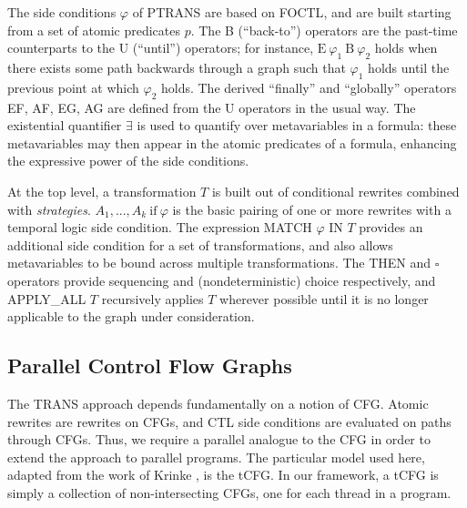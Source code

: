 \documentclass{eptcs}
\newcommand{\ptrans}[0]{PTRANS}
\newcommand{\EB}[2]{\textrm{E}\ #1\ \textrm{B}\ #2}
\begin{document}
The side conditions $\varphi$ of {\ptrans} are based on \ac{FOCTL}, and are built starting from a set of atomic predicates $p$. The B (``back-to'') operators are the past-time counterparts to the U (``until'') operators; for instance, $\EB{\varphi_1}{\varphi_2}$ holds when there exists some path backwards through a graph such that $\varphi_1$ holds until the previous point at which $\varphi_2$ holds. The derived ``finally'' and ``globally'' operators EF, AF, EG, AG are defined from the U operators in the usual way. 
The existential quantifier $\exists$ is used to quantify over metavariables in a formula: these metavariables may then appear in the atomic predicates of a formula, enhancing the expressive power of the side conditions.

At the top level, a transformation $T$ is built out of conditional rewrites combined with \emph{strategies}.
$A_1,...,A_k\ \mathrm{if}\ \varphi$ is the basic pairing of one or more rewrites with a temporal logic side condition.  The expression MATCH $\varphi$ IN $T$ provides an additional side condition for a set of transformations, and also allows metavariables to be bound across multiple transformations.  The THEN and $\square$ operators provide sequencing and (nondeterministic) choice respectively, and APPLY\_ALL $T$ recursively applies $T$ wherever possible until it is no longer applicable to the graph under consideration.

\subsection{Parallel Control Flow Graphs}
\label{tcfg}
The TRANS approach depends fundamentally on a notion of \ac{CFG}.  Atomic rewrites are rewrites on \acp{CFG}, and \ac{CTL} side conditions are evaluated on paths through \acp{CFG}.  Thus, we require a parallel analogue to the \ac{CFG} in order to extend the approach to parallel programs.  The particular model used here, adapted from the work of Krinke \cite{tcfg}, is the \ac{tCFG}.  In our framework, a \ac{tCFG} is simply a collection of non-intersecting \acp{CFG}, one for each thread in a program. 
\end{document}
